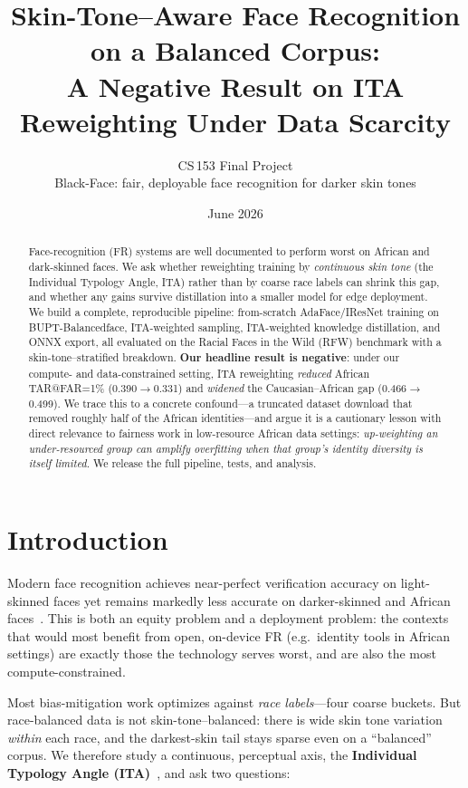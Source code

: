 \documentclass[10pt,twocolumn]{article}
\title{\textbf{Skin-Tone--Aware Face Recognition on a Balanced Corpus:\\
A Negative Result on ITA Reweighting Under Data Scarcity}}
\author{CS\,153 Final Project \\ \small Black-Face: fair, deployable face recognition for darker skin tones}
\date{June 2026}
\begin{document}
\maketitle

\begin{abstract}
Face-recognition (FR) systems are well documented to perform worst on African
and dark-skinned faces. We ask whether reweighting training by \emph{continuous
skin tone} (the Individual Typology Angle, ITA) rather than by coarse race
labels can shrink this gap, and whether any gains survive distillation into a
smaller model for edge deployment. We build a complete, reproducible pipeline:
from-scratch AdaFace/IResNet training on BUPT-Balancedface, ITA-weighted
sampling, ITA-weighted knowledge distillation, and ONNX export, all evaluated on
the Racial Faces in the Wild (RFW) benchmark with a skin-tone--stratified
breakdown. \textbf{Our headline result is negative}: under our compute- and
data-constrained setting, ITA reweighting \emph{reduced} African TAR@FAR=1\%
(0.390$\rightarrow$0.331) and \emph{widened} the Caucasian--African gap
(0.466$\rightarrow$0.499). We trace this to a concrete confound---a truncated
dataset download that removed roughly half of the African identities---and argue
it is a cautionary lesson with direct relevance to fairness work in low-resource
African data settings: \emph{up-weighting an under-resourced group can amplify
overfitting when that group's identity diversity is itself limited}. We release
the full pipeline, tests, and analysis.
\end{abstract}

\section{Introduction}
Modern face recognition achieves near-perfect verification accuracy on
light-skinned faces yet remains markedly less accurate on darker-skinned and
African faces~\cite{rfw,gendershades}. This is both an equity problem and a
deployment problem: the contexts that would most benefit from open, on-device FR
(e.g.\ identity tools in African settings) are exactly those the technology
serves worst, and are also the most compute-constrained.

Most bias-mitigation work optimizes against \emph{race labels}---four coarse
buckets. But race-balanced data is not skin-tone--balanced: there is wide skin
tone variation \emph{within} each race, and the darkest-skin tail stays sparse
even on a ``balanced'' corpus. We therefore study a continuous, perceptual axis,
the \textbf{Individual Typology Angle (ITA)}~\cite{ita}, and ask two questions:
\end{document}
